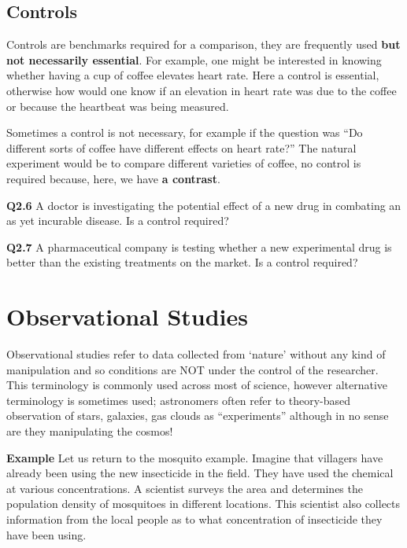 \documentclass[
  oneside]{krantz}
\begin{document}
\hypertarget{controls}{%
\subsection{Controls}\label{controls}}

Controls are benchmarks required for a comparison, they are frequently used \textbf{but not necessarily essential}. For example, one might be interested in knowing whether having a cup of coffee elevates heart rate. Here a control is essential, otherwise how would one know if an elevation in heart rate was due to the coffee or because the heartbeat was being measured.

Sometimes a control is not necessary, for example if the question was ``Do different sorts of coffee have different effects on heart rate?'' The natural experiment would be to compare different varieties of coffee, no control is required because, here, we have \textbf{a contrast}.

\textbf{Q2.6} A doctor is investigating the potential effect of a new drug in combating an as yet incurable disease. Is a control required?

\textbf{Q2.7} A pharmaceutical company is testing whether a new experimental drug is better than the existing treatments on the market. Is a control required?

\hypertarget{observational-studies}{%
\section{Observational Studies}\label{observational-studies}}

Observational studies refer to data collected from `nature' without any kind of manipulation and so conditions are NOT under the control of the researcher. This terminology is commonly used across most of science, however alternative terminology is sometimes used; astronomers often refer to theory-based observation of stars, galaxies, gas clouds as ``experiments'' although in no sense are they manipulating the cosmos!

\textbf{Example} Let us return to the mosquito example. Imagine that villagers have already been using the new insecticide in the field. They have used the chemical at various concentrations. A scientist surveys the area and determines the population density of mosquitoes in different locations.
This scientist also collects information from the local people as to what concentration of insecticide they have been using.
\end{document}
